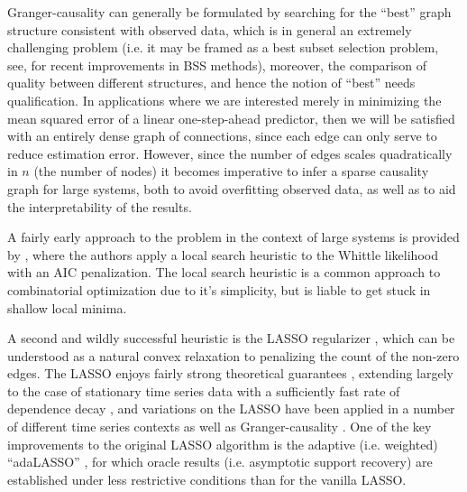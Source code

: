 \documentclass{statsoc}
\begin{document}
Granger-causality can generally be formulated by searching for the
``best'' graph structure consistent with observed data, which is in
general an extremely challenging problem (i.e. it may be framed as a
best subset selection problem, see, \cite{hastie_bss_comp} for recent
improvements in BSS methods), moreover, the comparison of quality
between different structures, and hence the notion of ``best'' needs
qualification.  In applications where we are interested merely in
minimizing the mean squared error of a linear one-step-ahead
predictor, then we will be satisfied with an entirely dense graph of
connections, since each edge can only serve to reduce estimation
error.  However, since the number of edges scales quadratically in $n$
(the number of nodes) it becomes imperative to infer a sparse
causality graph for large systems, both to avoid overfitting observed
data, as well as to aid the interpretability of the results.

A fairly early approach to the problem in the context of large systems
is provided by \cite{bach2004learning}, where the authors apply a
local search heuristic to the Whittle likelihood with an AIC
penalization.  The local search heuristic is a common approach to
combinatorial optimization due to it's simplicity, but is liable to
get stuck in shallow local minima.

A second and wildly successful heuristic is the LASSO regularizer
\cite{tibshirani1996regression}, which can be understood as a natural
convex relaxation to penalizing the count of the non-zero edges.  The
LASSO enjoys fairly strong theoretical guarantees
\cite{wainwright2009sharp}, extending largely to the case of
stationary time series data with a sufficiently fast rate of
dependence decay \cite{basu2015} \cite{wong2016lasso}
\cite{autoregressive_process_modelling_via_the_lasso_procedure}, and
variations on the LASSO have been applied in a number of different
time series contexts as well as Granger-causality
\cite{DBLP:journals/corr/HallacPBL17} \cite{haufe2008sparse}
\cite{bolstad2011causal} \cite{he2013stationary}
\cite{grouped_graphical_granger_modelling_for_gene_expression_regulatory_networks_discovery}.
One of the key improvements to the original LASSO algorithm is the
adaptive (i.e. weighted) ``adaLASSO'' \cite{adaptive_lasso_zou2006},
for which oracle results (i.e. asymptotic support recovery) are
established under less restrictive conditions than for the vanilla
LASSO.

\end{document}

